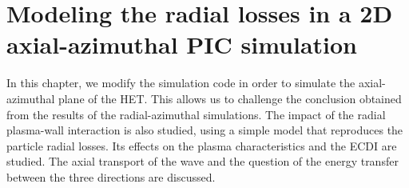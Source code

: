 



\chapter{Modeling the radial losses in a 2D axial-azimuthal PIC simulation}
\label{ch-6}


\begin{Chabstract}
  In this chapter, we modify the simulation code \LPPic in order to simulate the axial-azimuthal plane of the \ac{HET}.
  This allows us to challenge the conclusion obtained from the results of the radial-azimuthal simulations.
  The impact of the radial plasma-wall interaction is also studied, using a simple model that reproduces the particle radial losses.
  Its effects on the plasma characteristics and the \ac{ECDI} are studied.
  The axial transport of the wave and the question of the energy transfer between the three directions are discussed.
\end{Chabstract}

\renewcommand\subfigurewidth{0.45\textwidth}

% 
% 

\minitoc



% 




